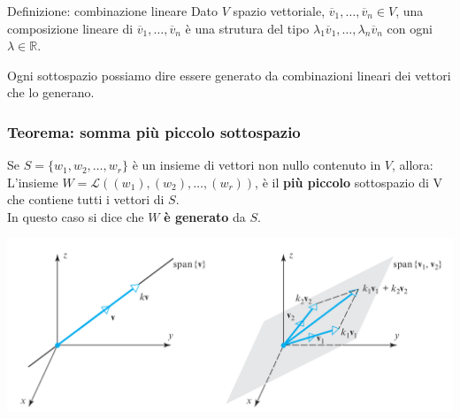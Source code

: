 \documentclass[x11names]{article}
\begin{document}
\begin{center}
\colorbox{myblue}{\begin{minipage}{5.75in}
\begin{blues}{Definizione: combinazione lineare}
Dato $V$ spazio vettoriale, $\overline{v}_{1},\dots,\overline{v}_{n} \in V$, una composizione lineare di $\overline{v}_{1},\dots,\overline{v}_{n}$ è una strutura del tipo $\lambda_{1}\overline{v}_{1},\dots,\lambda_{n}\overline{v}_{n}$ con ogni $\lambda \in \mathbb{R}$.
\end{blues}
\end{minipage}}        
\end{center}
Ogni sottospazio possiamo dire essere generato da combinazioni lineari dei vettori che lo generano. 


\begin{center}
	\colorbox{myred}{\begin{minipage}{5.75in}
			\begin{redes}{}
				\subsubsection{Teorema: somma più piccolo sottospazio}
				Se $S=\{w_1,w_2,\dots,w_{r}\}$ è un insieme di vettori non nullo contenuto in $V$, allora:  \\
				L'insieme  $W = \mathscr{L}\left(\left(w_1\right),\left(w_2\right),\dots,\left(w_{r}\right)\right)$, è il \textbf{più piccolo} sottospazio di V che contiene tutti i vettori di $S$. \\
				In questo caso si dice che  $W$  \textbf{è generato} da $S$.
				
			\end{redes}
	\end{minipage}}        
\end{center}



\begin{center}
\includegraphics[scale=0.3]{figures/span.png}
\end{center}
\end{document}
